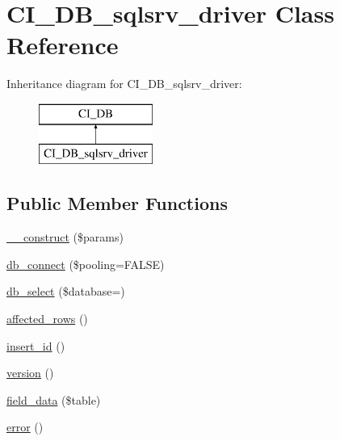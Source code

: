 \hypertarget{class_c_i___d_b__sqlsrv__driver}{}\section{C\+I\+\_\+\+D\+B\+\_\+sqlsrv\+\_\+driver Class Reference}
\label{class_c_i___d_b__sqlsrv__driver}
Inheritance diagram for C\+I\+\_\+\+D\+B\+\_\+sqlsrv\+\_\+driver\+:\begin{figure}[H]
\begin{center}
\leavevmode
\includegraphics[height=2.000000cm]{class_c_i___d_b__sqlsrv__driver}
\end{center}
\end{figure}
\subsection*{Public Member Functions}
\begin{DoxyCompactItemize}
\item 
\mbox{\hyperlink{class_c_i___d_b__sqlsrv__driver_ac5b1b6bd430f7f1dc1b9660a61a2934b}{\+\_\+\+\_\+construct}} (\$params)
\item 
\mbox{\hyperlink{class_c_i___d_b__sqlsrv__driver_a9930c6204361c4e4851423c30617b7c0}{db\+\_\+connect}} (\$pooling=F\+A\+L\+SE)
\item 
\mbox{\hyperlink{class_c_i___d_b__sqlsrv__driver_a067dd6e940da224074a198a3f6396c61}{db\+\_\+select}} (\$database=\textquotesingle{}\textquotesingle{})
\item 
\mbox{\hyperlink{class_c_i___d_b__sqlsrv__driver_ab4b5b15fda5bf5b1537073bfbc107647}{affected\+\_\+rows}} ()
\item 
\mbox{\hyperlink{class_c_i___d_b__sqlsrv__driver_acee44b8c5d564b731cb63ffff236d73f}{insert\+\_\+id}} ()
\item 
\mbox{\hyperlink{class_c_i___d_b__sqlsrv__driver_ae759868ae99445d13ceeeb79c88d0627}{version}} ()
\item 
\mbox{\hyperlink{class_c_i___d_b__sqlsrv__driver_acc9cddf0e7df4e4c5af95eab2359e5ba}{field\+\_\+data}} (\$table)
\item 
\mbox{\hyperlink{class_c_i___d_b__sqlsrv__driver_a981b4ae93f2c9f7ae5c3b046ddcba896}{error}} ()
\end{DoxyCompactItemize}
